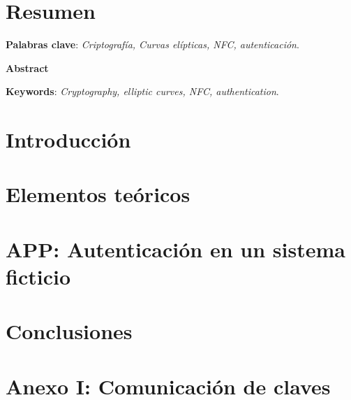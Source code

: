 \documentclass[a4paper,12pt, twoside, openright,makeidx]{book}
\newcommand\blankpage{%
    \null
    \thispagestyle{empty}%
    \addtocounter{page}{-1}%
    \newpage}
\begin{document}
\begingroup
\let\cleardoublepage\clearpage
\listoffigures
\endgroup

\chapter*{Resumen}
\label{Resumen}


\label{Palabras clave}
\begin{center}
\textbf{Palabras clave}: \textit{Criptografía, Curvas elípticas, NFC, autenticación}.
\end{center}

\newpage
\label{Abstract}
\begin{center}
\textbf{Abstract}
\end{center}


\label{Keywords}
\begin{center}
\textbf{Keywords}: \textit{Cryptography, elliptic curves, NFC, authentication}.
\end{center}

\chapter{Introducción}
\label{Introducción}


\chapter{Elementos teóricos}
\label{Elementos teoricos}

%
\chapter{APP: Autenticación en un sistema ficticio}
\label{APP: Autenticación en sistema ficticio}

%
\chapter{Conclusiones}
\label{Conclusiones}


\afterpage{\blankpage}	%
\chapter*{Anexo I: Comunicación de claves}
\label{AnexoI}




\nocite{*}
\afterpage{\blankpage}	%

\end{document}
